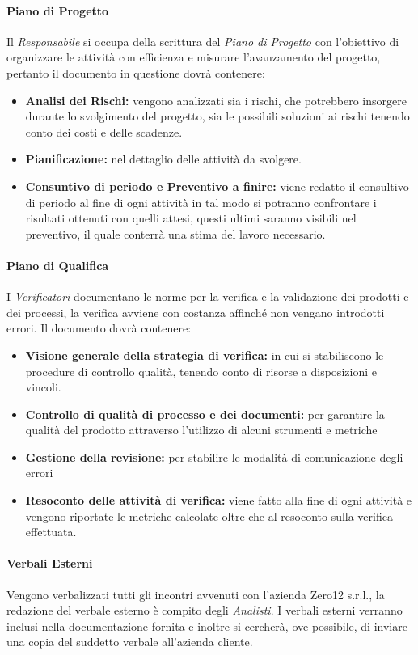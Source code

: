 \paragraph{Piano di Progetto}
Il \textit{Responsabile} si occupa della scrittura del \textit{Piano di Progetto} con l'obiettivo di organizzare le attività con efficienza e misurare l'avanzamento del progetto, pertanto il documento in questione dovrà contenere:
\begin{itemize}
	\item \textbf{Analisi dei Rischi:} vengono analizzati sia i rischi, che potrebbero insorgere durante lo svolgimento del progetto, sia le possibili soluzioni ai rischi tenendo conto dei costi e delle scadenze.
	\item \textbf{Pianificazione:} nel dettaglio delle attività da svolgere.
	\item \textbf{Consuntivo di periodo e Preventivo a finire:} viene redatto il consultivo di periodo al fine di ogni attività in tal modo si potranno confrontare i risultati ottenuti con quelli attesi, questi ultimi saranno visibili nel preventivo, il quale conterrà una stima del lavoro necessario.
\end{itemize}

\paragraph{Piano di Qualifica}
I \textit{Verificatori} documentano le norme per la verifica e la validazione dei prodotti e dei processi, la verifica avviene con costanza affinché non vengano introdotti errori. Il documento dovrà contenere:
\begin{itemize}
	\item \textbf{Visione generale della strategia di verifica:} in cui si stabiliscono le procedure di controllo qualità, tenendo conto di risorse a disposizioni e vincoli.
	\item \textbf{Controllo di qualità di processo e dei documenti:} per garantire la qualità del prodotto attraverso l'utilizzo di alcuni strumenti e metriche
	\item \textbf{Gestione della revisione:} per stabilire le modalità di comunicazione degli errori
	\item \textbf{Resoconto delle attività di verifica:} viene fatto alla fine di ogni attività e vengono riportate le metriche calcolate oltre che al resoconto sulla verifica effettuata.
\end{itemize}

\paragraph{Verbali Esterni}
Vengono verbalizzati tutti gli incontri avvenuti con l'azienda Zero12 s.r.l., la redazione del verbale esterno è compito degli \textit{Analisti}. I verbali esterni verranno inclusi nella documentazione fornita e inoltre si cercherà, ove possibile, di inviare una copia del suddetto verbale all'azienda cliente.

